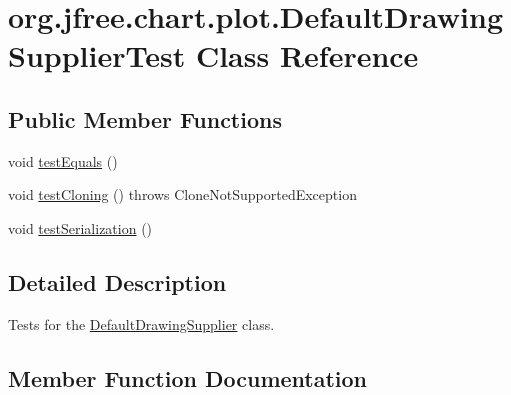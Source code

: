 \hypertarget{classorg_1_1jfree_1_1chart_1_1plot_1_1_default_drawing_supplier_test}{}\section{org.\+jfree.\+chart.\+plot.\+Default\+Drawing\+Supplier\+Test Class Reference}
\label{classorg_1_1jfree_1_1chart_1_1plot_1_1_default_drawing_supplier_test}
\subsection*{Public Member Functions}
\begin{DoxyCompactItemize}
\item 
void \mbox{\hyperlink{classorg_1_1jfree_1_1chart_1_1plot_1_1_default_drawing_supplier_test_a1dc309d827af590079eb86f3ac57ac61}{test\+Equals}} ()
\item 
void \mbox{\hyperlink{classorg_1_1jfree_1_1chart_1_1plot_1_1_default_drawing_supplier_test_a6e138c44a9614069e2e3cd9477d34048}{test\+Cloning}} ()  throws Clone\+Not\+Supported\+Exception 
\item 
void \mbox{\hyperlink{classorg_1_1jfree_1_1chart_1_1plot_1_1_default_drawing_supplier_test_ab272ff1a45dc79a01c2b0ad606e66e2f}{test\+Serialization}} ()
\end{DoxyCompactItemize}


\subsection{Detailed Description}
Tests for the \mbox{\hyperlink{classorg_1_1jfree_1_1chart_1_1plot_1_1_default_drawing_supplier}{Default\+Drawing\+Supplier}} class. 

\subsection{Member Function Documentation}
\mbox{\label{classorg_1_1jfree_1_1chart_1_1plot_1_1_default_drawing_supplier_test_a6e138c44a9614069e2e3cd9477d34048}} 
